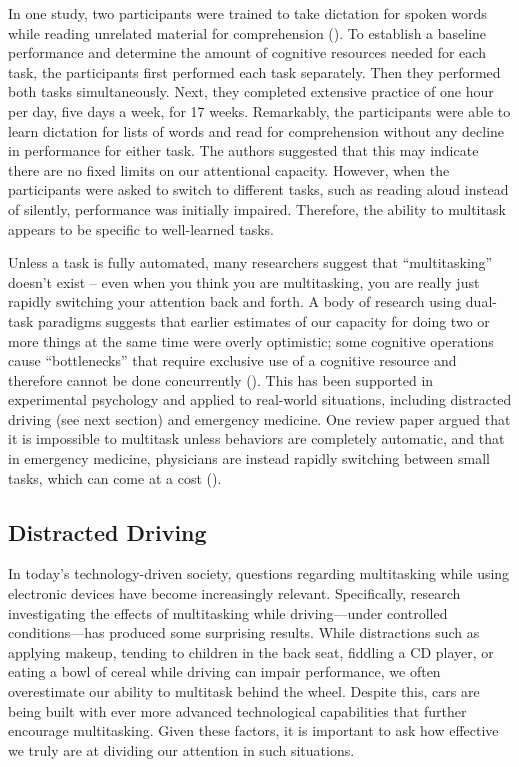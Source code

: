\documentclass[
]{krantz}
\begin{document}
In one study, two participants were trained to take dictation for spoken words while reading unrelated material for comprehension (). To establish a baseline performance and determine the amount of cognitive resources needed for each task, the participants first performed each task separately. Then they performed both tasks simultaneously. Next, they completed extensive practice of one hour per day, five days a week, for 17 weeks. Remarkably, the participants were able to learn dictation for lists of words and read for comprehension without any decline in performance for either task. The authors suggested that this may indicate there are no fixed limits on our attentional capacity. However, when the participants were asked to switch to different tasks, such as reading aloud instead of silently, performance was initially impaired. Therefore, the ability to multitask appears to be specific to well-learned tasks.

Unless a task is fully automated, many researchers suggest that ``multitasking'' doesn't exist -- even when you think you are multitasking, you are really just rapidly switching your attention back and forth. A body of research using dual-task paradigms suggests that earlier estimates of our capacity for doing two or more things at the same time were overly optimistic; some cognitive operations cause ``bottlenecks'' that require exclusive use of a cognitive resource and therefore cannot be done concurrently (). This has been supported in experimental psychology and applied to real-world situations, including distracted driving (see next section) and emergency medicine. One review paper argued that it is impossible to multitask unless behaviors are completely automatic, and that in emergency medicine, physicians are instead rapidly switching between small tasks, which can come at a cost ().

\subsection*{Distracted Driving}\label{distracted-driving}


In today's technology-driven society, questions regarding multitasking while using electronic devices have become increasingly relevant. Specifically, research investigating the effects of multitasking while driving---under controlled conditions---has produced some surprising results. While distractions such as applying makeup, tending to children in the back seat, fiddling a CD player, or eating a bowl of cereal while driving can impair performance, we often overestimate our ability to multitask behind the wheel. Despite this, cars are being built with ever more advanced technological capabilities that further encourage multitasking. Given these factors, it is important to ask how effective we truly are at dividing our attention in such situations.
\end{document}
